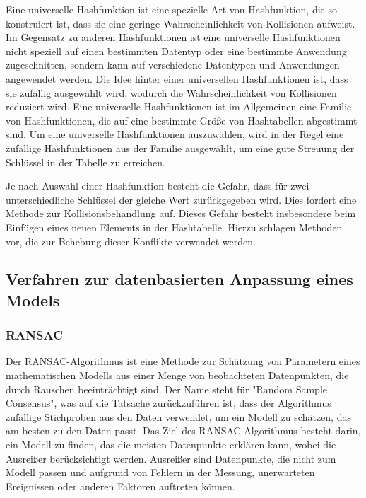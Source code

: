 Eine universelle Hashfunktion ist eine spezielle Art von Hashfunktion, die so konstruiert ist, dass sie eine geringe Wahrscheinlichkeit von Kollisionen aufweist. Im Gegensatz zu anderen Hashfunktionen ist eine universelle Hashfunktionen nicht speziell auf einen bestimmten Datentyp oder eine bestimmte Anwendung zugeschnitten, sondern kann auf verschiedene Datentypen und Anwendungen angewendet werden. Die Idee hinter einer universellen Hashfunktionen ist, dass sie zufällig ausgewählt wird, wodurch die Wahrscheinlichkeit von Kollisionen reduziert wird. Eine universelle Hashfunktionen ist im Allgemeinen eine Familie von Hashfunktionen, die auf eine bestimmte Größe von Hashtabellen abgestimmt sind. Um eine universelle Hashfunktionen auszuwählen, wird in der Regel eine zufällige Hashfunktionen aus der Familie ausgewählt, um eine gute Streuung der Schlüssel in der Tabelle zu erreichen. \autocite[232-234]{hubwieser_fundamente_2015} \autocite[114-116]{knebl_algorithmen_2021}

Je nach Auswahl einer Hashfunktion besteht die Gefahr, dass für zwei unterschiedliche Schlüssel der gleiche Wert zurückgegeben wird. Dies fordert eine Methode zur Kollisionsbehandlung auf. Dieses Gefahr besteht insbesondere beim Einfügen eines neuen Elements in der Hashtabelle. Hierzu schlagen \textcite[568-572]{ernst_grundkurs_2020} Methoden vor, die zur Behebung dieser Konflikte verwendet werden. 

\subsection{Verfahren zur datenbasierten Anpassung eines Models}

\subsubsection{RANSAC}
Der RANSAC-Algorithmus ist eine Methode zur Schätzung von Parametern eines mathematischen Modells aus einer Menge von beobachteten Datenpunkten, die durch Rauschen beeinträchtigt sind. Der Name steht für "Random Sample Consensus", was auf die Tatsache zurückzuführen ist, dass der Algorithmus zufällige Stichproben aus den Daten verwendet, um ein Modell zu schätzen, das am besten zu den Daten passt. Das Ziel des RANSAC-Algorithmus besteht darin, ein Modell zu finden, das die meisten Datenpunkte erklären kann, wobei die Ausreißer berücksichtigt werden. Ausreißer sind Datenpunkte, die nicht zum Modell passen und aufgrund von Fehlern in der Messung, unerwarteten Ereignissen oder anderen Faktoren auftreten können. \autocite[381-383]{fischler_random_1981}


